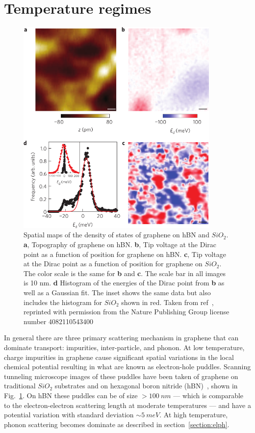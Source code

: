 \section{Temperature regimes}
\begin{figure}
\centering
\includegraphics[width=100mm]{figures/Dirac_fluid/charge_puddles.png}
\caption{Spatial maps of the density of states of graphene on hBN and $SiO_2$. \textbf{a}, Topography of graphene on hBN. \textbf{b}, Tip voltage at the Dirac point as a function of position for graphene on hBN. \textbf{c}, Tip voltage at the Dirac point as a function of position for graphene on $SiO_2$. The color scale is the same for \textbf{b} and \textbf{c}. The scale bar in all images is 10 nm. \textbf{d} Histogram of the energies of the Dirac point from \textbf{b} as well as a Gaussian fit. The inset shows the same data but also includes the histogram for $SiO_2$ shown in red. Taken from ref~\cite{xue_scanning_2011}, reprinted with permission from the Nature Publishing Group license number 4082110543400}
\label{fig:charge_puddles}
\end{figure}
In general there are three primary scattering mechanism in graphene that can dominate transport: impurities, inter-particle, and phonon. At low temperature, charge impurities in graphene cause significant spatial variations in the local chemical potential resulting in what are known as electron-hole puddles. Scanning tunneling microscope images of these puddles have been taken of graphene on traditional $SiO_2$ substrates and on hexagonal boron nitride (hBN)~\cite{xue_scanning_2011}, shown in Fig.~\ref{fig:charge_puddles}. On hBN these puddles can be of size $>100~nm$ --- which is comparable to the electron-electron scattering length at moderate temperatures --- and have a potential variation with standard deviation ${\sim 5}~meV$. At high temperature, phonon scattering becomes dominate as described in section~\ref{section:elph}. 


